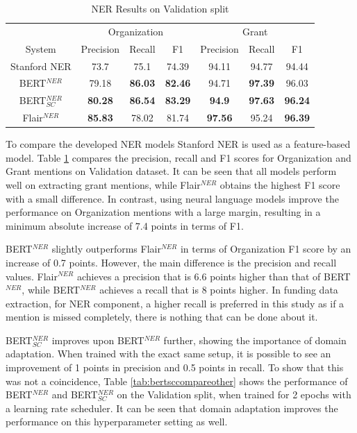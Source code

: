 \documentclass{report}
\theoremstyle{definition}
\theoremstyle{remark}
\begin{document}
\begin{table}
    \centering
    \begin{tabular}{c| c c c| c c c}
    &\multicolumn{3}{c|}{Organization}&\multicolumn{3}{c}{Grant} \\
    System&Precision&Recall&F1&Precision&Recall&F1\\
    \hline
    Stanford NER & 73.7&	75.1&74.39&94.11&94.77&94.44
 \\[0.7ex]
    BERT$^{NER}$ & 79.18&\textbf{86.03}&\textbf{82.46}&94.71&\textbf{97.39}&96.03
\\[0.7ex]
    BERT$^{NER}_{SC}$ & \textbf{80.28}&\textbf{86.54}&\textbf{83.29}&\textbf{94.9}	&\textbf{97.63}&\textbf{96.24}
  \\[0.7ex]
    Flair$^{NER}$& \textbf{85.83}&78.02&81.74&\textbf{97.56}&95.24&\textbf{96.39}
 \\[0.7ex]
    \end{tabular}
    \caption{NER Results on Validation split}
    \label{tab:all_ner_results}
\end{table}

To compare the developed NER models Stanford NER \cite{stanfordNER} is used as a feature-based model. Table \ref{tab:all_ner_results} compares the precision, recall and F1 scores for Organization and Grant mentions on Validation dataset. It can be seen that all models perform well on extracting grant mentions, while Flair$^{NER}$ obtains the highest F1 score with a small difference. In contrast, using neural language models improve the performance on Organization mentions with a large margin, resulting in a minimum absolute increase of 7.4 points in terms of F1.

BERT$^{NER}$ slightly outperforms Flair$^{NER}$ in terms of Organization F1 score by an increase of 0.7 points. However, the main difference is the precision and recall values. Flair$^{NER}$ achieves a precision that is 6.6 points higher than that of BERT$^{NER}$, while BERT$^{NER}$ achieves a recall that is 8 points higher. In funding data extraction, for NER component, a higher recall is preferred in this study as if a mention is missed completely, there is nothing that can be done about it.

BERT$^{NER}_{SC}$ improves upon BERT$^{NER}$ further, showing the importance of domain adaptation. When trained with the exact same setup, it is possible to see an improvement of 1 points in precision and 0.5 points in recall. To show that this was not a coincidence, Table \ref{tab:bertsccompareother} shows the performance of BERT$^{NER}$ and BERT$^{NER}_{SC}$ on the Validation split, when trained for 2 epochs with a learning rate scheduler. It can be seen that domain adaptation improves the performance on this hyperparameter setting as well.
\end{document}
